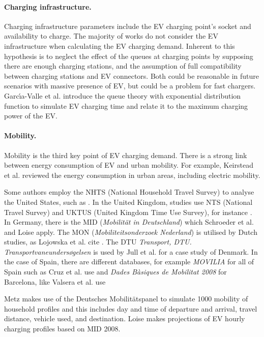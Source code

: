\documentclass[a4paper,11pt,twoside,openright]{report}
\begin{document}
\paragraph{Charging infrastructure.}

Charging infrastructure parameters include the EV charging point's socket and availability to charge. The majority of works do not consider the EV infrastructure when calculating the EV charging demand. Inherent to this hypothesis is to neglect the effect of the queues at charging points by supposing there are enough charging stations, and the assumption of full compatibility between charging stations and EV connectors. Both could be reasonable in future scenarios with massive presence of EV, but could be a problem for fast chargers. Garc\'{\i}a-Valle et al. \cite{Garcia2009} introduce the queue theory with exponential distribution function to simulate EV charging time and relate it to the maximum charging power of the EV.

\paragraph{Mobility.}
Mobility is the third key point of EV charging demand. There is a strong link between energy consumption of EV and urban mobility. For example, Keirstead et al. \cite{Keirstead2012} reviewed the energy consumption in urban areas, including electric mobility.

Some authors employ the NHTS (National Household Travel Survey) to analyse the United States, such as \cite{Lyon2012,Zhang2011,FactorAnalysisQinglai,Kelly2012,Stephens_Michigan_2010,Weiller2011}. In the United Kingdom, studies use NTS (National Travel Survey) and UKTUS (United Kingdom Time Use Survey), for instance \cite{Sikai2010,Sikai2009,Sikai2011}. In Germany, there is the MID (\textit{Mobilit\"{a}t in Deutschland}) which Schroeder et al. \cite{Schroeder2012} and Loise \cite{Loisel2014} apply. The MON (\textit{Mobiliteitsonderzoek Nederland}) is utilised by Dutch studies, as Lojowska et al. cite \cite{Lojowska2011}. The DTU \textit{Transport, DTU. Transportvaneunders\o{}gelsen} is used by Jull et al. \cite{Juul2012} for a case study of Denmark. In the case of Spain, there are different databases, for example \textit{MOVILIA} for all of Spain such as Cruz et al. \cite{MiguelCruz2012} use and \textit{Dades B\`{a}siques de Mobilitat 2008} for Barcelona, like Valsera et al. use \cite{Valsera2011}

Metz \cite{Metz2012} makes use of the Deutsches Mobilit\"{a}tspanel to simulate 1000 mobility of household profiles and this includes day and time of departure and arrival, travel distance, vehicle used, and destination. Loise \cite{Loisel2014} makes projections of EV hourly charging profiles based on MID 2008.
\end{document}
